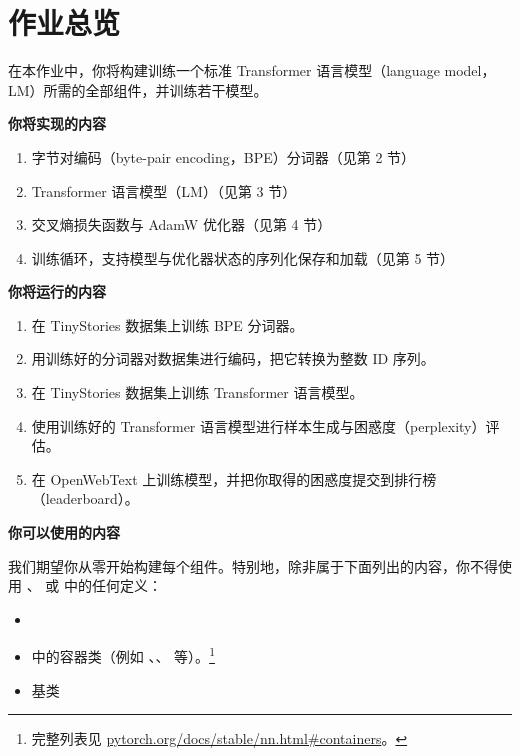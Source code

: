 
\section{作业总览}

在本作业中，你将构建训练一个标准 Transformer 语言模型（language model，LM）所需的全部组件，并训练若干模型。

\textbf{你将实现的内容}
\begin{enumerate}
  \item 字节对编码（byte-pair encoding，BPE）分词器（见第 2 节）
  \item Transformer 语言模型（LM）（见第 3 节）
  \item 交叉熵损失函数与 AdamW 优化器（见第 4 节）
  \item 训练循环，支持模型与优化器状态的序列化保存和加载（见第 5 节）
\end{enumerate}

\textbf{你将运行的内容}
\begin{enumerate}
  \item 在 TinyStories 数据集上训练 BPE 分词器。
  \item 用训练好的分词器对数据集进行编码，把它转换为整数 ID 序列。
  \item 在 TinyStories 数据集上训练 Transformer 语言模型。
  \item 使用训练好的 Transformer 语言模型进行样本生成与困惑度（perplexity）评估。
  \item 在 OpenWebText 上训练模型，并把你取得的困惑度提交到排行榜（leaderboard）。
\end{enumerate}

\textbf{你可以使用的内容}

我们期望你从零开始构建每个组件。特别地，除非属于下面列出的内容，你不得使用 、 或  中的任何定义：
\begin{itemize}
  \item {}
  \item {} 中的容器类（例如 、、 等）。\footnote{完整列表见 \url{pytorch.org/docs/stable/nn.html\#containers}。}
  \item {} 基类
\end{itemize}

